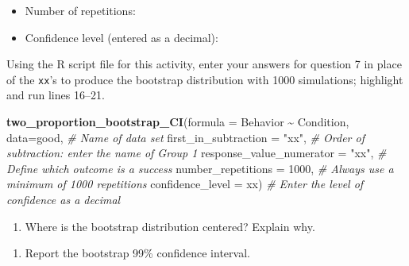 \documentclass[
]{report}
\newenvironment{Shaded}{\begin{snugshade}}{\end{snugshade}}
\newcommand{\AttributeTok}[1]{\textcolor[rgb]{0.13,0.29,0.53}{#1}}
\newcommand{\CommentTok}[1]{\textcolor[rgb]{0.56,0.35,0.01}{\textit{#1}}}
\newcommand{\DecValTok}[1]{\textcolor[rgb]{0.00,0.00,0.81}{#1}}
\newcommand{\FunctionTok}[1]{\textcolor[rgb]{0.13,0.29,0.53}{\textbf{#1}}}
\newcommand{\NormalTok}[1]{#1}
\newcommand{\SpecialCharTok}[1]{\textcolor[rgb]{0.81,0.36,0.00}{\textbf{#1}}}
\newcommand{\StringTok}[1]{\textcolor[rgb]{0.31,0.60,0.02}{#1}}
\providecommand{\tightlist}{%
  \setlength{\itemsep}{0pt}\setlength{\parskip}{0pt}}
\begin{document}
\begin{itemize}
\tightlist
\item
  Number of repetitions:
\end{itemize}

\vspace{.15in}

\begin{itemize}
\tightlist
\item
  Confidence level (entered as a decimal):
\end{itemize}

\vspace{.15in}

Using the R script file for this activity, enter your answers for question 7 in place of the \texttt{xx}'s to produce the bootstrap distribution with 1000 simulations; highlight and run lines 16--21.

\begin{Shaded}
\begin{Highlighting}[]
\FunctionTok{two\_proportion\_bootstrap\_CI}\NormalTok{(}\AttributeTok{formula =}\NormalTok{ Behavior }\SpecialCharTok{\textasciitilde{}}\NormalTok{ Condition, }
        \AttributeTok{data=}\NormalTok{good, }\CommentTok{\# Name of data set}
        \AttributeTok{first\_in\_subtraction =} \StringTok{"xx"}\NormalTok{, }\CommentTok{\# Order of subtraction: enter the name of Group 1}
        \AttributeTok{response\_value\_numerator =} \StringTok{"xx"}\NormalTok{, }\CommentTok{\# Define which outcome is a success }
        \AttributeTok{number\_repetitions =} \DecValTok{1000}\NormalTok{, }\CommentTok{\# Always use a minimum of 1000 repetitions}
        \AttributeTok{confidence\_level =}\NormalTok{ xx) }\CommentTok{\# Enter the level of confidence as a decimal}
\end{Highlighting}
\end{Shaded}

\begin{enumerate}
\def\labelenumi{\arabic{enumi}.}
\setcounter{enumi}{10}
\tightlist
\item
  Where is the bootstrap distribution centered? Explain why.
\end{enumerate}

\vspace{0.8in}

\begin{enumerate}
\def\labelenumi{\arabic{enumi}.}
\setcounter{enumi}{11}
\tightlist
\item
  Report the bootstrap 99\% confidence interval.
\end{enumerate}
\end{document}
